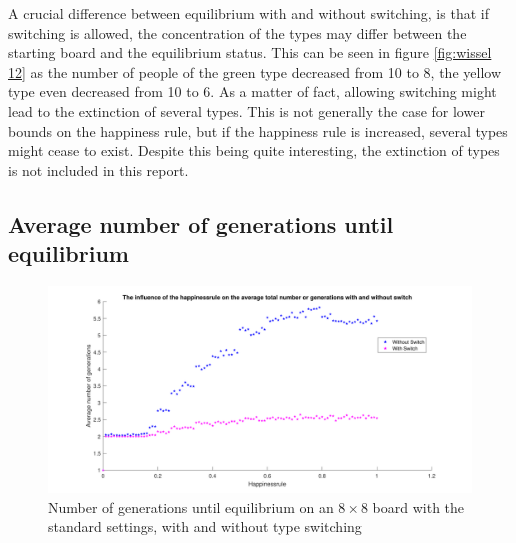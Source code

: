 A crucial difference between equilibrium with and without switching, is that if switching is allowed, the concentration of the types may differ between the starting board and the equilibrium status. 
This can be seen in figure \ref{fig:wissel 12} as the number of people of the green type decreased from 10 to 8, the yellow type even decreased from 10 to 6. 
As a matter of fact, allowing switching might lead to the extinction of several types. 
This is not generally the case for lower bounds on the happiness rule, but if the happiness rule is increased, several types might cease to exist. Despite this being quite interesting, the extinction of types is not included in this report.\\

\subsection{Average number of generations until equilibrium}

\begin{figure}[H]
	\centering
    \includegraphics[width=\textwidth]{happinessrule-totaantgenwithswitchorwithoutswitch}
    \caption{Number of generations until equilibrium on an $8\times 8$ board with the standard settings, with and without type switching}
    \label{fig:AantGenS}
\end{figure}